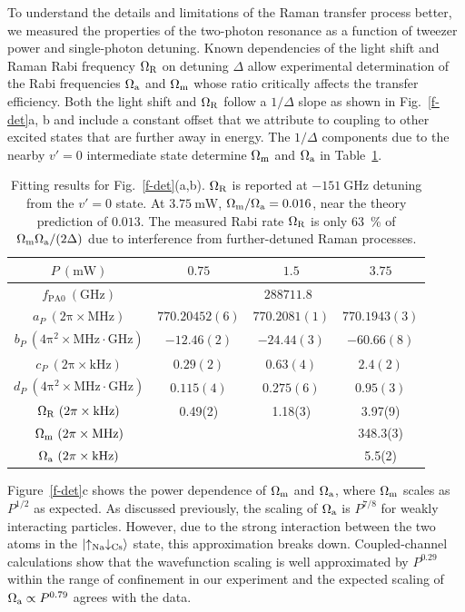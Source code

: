 \documentclass[aps,prx,twocolumn,10pt,superscriptaddress]{revtex4-2}
\begin{document}
To understand the details and limitations of the Raman transfer process better,
we measured the properties of the two-photon resonance as a function of tweezer power and single-photon detuning.
Known dependencies of the light shift and Raman Rabi frequency $\Omega_{\rm R}$ on detuning $\Delta$ allow experimental determination of the Rabi frequencies
$ \Omega_{\rm a} $ and $\Omega_{\rm m}$ whose ratio critically affects the transfer efficiency.
Both the light shift and $\Omega_{\rm R}$ follow a $1/\Delta$ slope as shown in Fig.~\ref{f-det}a, b and include a constant offset that we attribute to coupling to other excited states that are further away in energy.
The $1/\Delta$ components due to the nearby $v'=0$ intermediate state determine $\Omega_{\rm m} $ and $ \Omega_{\rm a} $ in Table~\ref{tab:f-det:fit}.

\begin{table}[ht]
  \centering
  \begin{tabular}{|c|c|c|c|}
    $P~(\mathrm{mW})$&$0.75$&$1.5$&$3.75$\\\hline
    $f_{\mathrm{PA}0}~(\mathrm{GHz})$&\multicolumn{3}{|c|}{$288711.8$}\\\hline
    $a_P~(\mathrm{2\pi\times MHz})$&$770.20452(6)$&$770.2081(1)$&$770.1943(3)$\\
    $b_P~(\mathrm{4\pi^2\times MHz\cdot GHz})$&$-12.46(2)$&$-24.44(3)$&$-60.66(8)$\\\hline
    $c_P~(\mathrm{2\pi\times kHz})$&$0.29(2)$&$0.63(4)$&$2.4(2)$\\
    $d_P~(\mathrm{4\pi^2\times MHz\cdot GHz})$&$0.115(4)$&$0.275(6)$&$0.95(3)$\\ \hline
    $\Omega_{\rm R}~(\mathrm{2\pi\times kHz})$ & 0.49(2) & 1.18(3) & 3.97(9) \\
    $\Omega_{\rm m}~(\mathrm{2\pi\times MHz})$ & & & 348.3(3) \\
    $\Omega_{\rm a}~(\mathrm{2\pi\times kHz})$ & & & 5.5(2)
  \end{tabular}
  \caption{Fitting results for Fig.~\ref{f-det}(a,b). $\Omega_{\rm R}$ is reported at $-151~\mathrm{GHz}$ detuning from the $v' = 0$ state.  At $3.75~\mathrm{mW}$, $\Omega_{\rm m}/\Omega_{\rm a}=0.016$, near the theory prediction of $0.013$.  The measured Rabi rate $\Omega_{\rm R}$ is only 63~\% of $\Omega_{\rm m} \Omega_{\rm a}/(2\Delta)$ due to interference from further-detuned Raman processes.
    \label{tab:f-det:fit}}
\end{table}

Figure~\ref{f-det}c shows the power dependence of $ \Omega_{\rm m} $ and $ \Omega_{\rm a} $, where $ \Omega_{\rm m} $ scales as $ P^{1/2} $ as expected. As discussed previously, the scaling of $ \Omega_{\rm a} $ is $P^{7/8}$ for weakly interacting particles.
However, due to the strong interaction between the two atoms in the $\ket{\uparrow_{\text{Na}}\downarrow_{\text{Cs}}}$ state, this approximation breaks down.
Coupled-channel calculations show that the wavefunction scaling
is well approximated by $P^{0.29}$ within the range of confinement in our experiment and the expected scaling of $ \Omega_{\rm a} \propto P^{0.79} $ agrees with the data.
\end{document}
